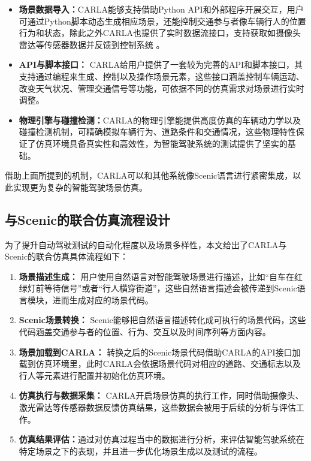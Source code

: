 \begin{itemize}
	\item \textbf{场景数据导入：}CARLA能够支持借助Python API和外部程序开展交互，用户可通过Python脚本动态生成相应场景，还能控制交通参与者像车辆行人的位置行为和状态，除此之外CARLA也提供了实时数据流接口，支持获取如摄像头雷达等传感器数据并反馈到控制系统 。
	
	\item \textbf{API与脚本接口：} CARLA给用户提供了一套较为完善的API和脚本接口，其支持通过编程来生成、控制以及操作场景元素，这些接口涵盖控制车辆运动、改变天气状况、管理交通信号等功能，可依据不同的仿真需求对场景进行实时调整。
	
	\item \textbf{物理引擎与碰撞检测：}CARLA的物理引擎能提供高度仿真的车辆动力学以及碰撞检测机制，可精确模拟车辆行为、道路条件和交通情况，这些物理特性保证了仿真环境具备真实性和高效性，为智能驾驶系统的测试提供了坚实的基础。
\end{itemize}

借助上面所提到的机制，CARLA可以和其他系统像Scenic语言进行紧密集成，以此实现更为复杂的智能驾驶场景仿真。

\subsection{与Scenic的联合仿真流程设计}

为了提升自动驾驶测试的自动化程度以及场景多样性，本文给出了CARLA与Scenic的联合仿真具体流程如下：

\begin{enumerate}
	\item \textbf{场景描述生成：} 用户使用自然语言对智能驾驶场景进行描述，比如“自车在红绿灯前等待信号”或者“行人横穿街道”，这些自然语言描述会被传递到Scenic语言模块，进而生成对应的场景代码。
	
	\item \textbf{Scenic场景转换：} Scenic能够把自然语言描述转化成可执行的场景代码，这些代码涵盖交通参与者的位置、行为、交互以及时间序列等方面内容。
	
	\item \textbf{场景加载到CARLA：} 转换之后的Scenic场景代码借助CARLA的API接口加载到仿真环境里，此时CARLA会依据场景代码对相应的道路、交通标志以及行人等元素进行配置并初始化仿真环境。
	
	\item \textbf{仿真执行与数据采集：} CARLA开启场景仿真的执行工作，同时借助摄像头、激光雷达等传感器数据反馈仿真结果，这些数据会被用于后续的分析与评估工作。
	
	\item \textbf{仿真结果评估：}通过对仿真过程当中的数据进行分析，来评估智能驾驶系统在特定场景之下的表现，并且进一步优化场景生成以及测试的流程。
\end{enumerate}

